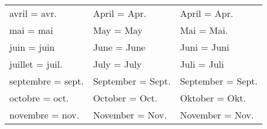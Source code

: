\begin{table}[!ht]
\begin{center}
\begin{tabular}{lll}
       avril = avr.       & April = Apr.       & April = Apr.\\
       mai = mai          & May = May          & Mai = Mai.\\
       juin = juin        & June = June        & Juni = Juni\\
       juillet = juil.    & July = July        & Juli = Juli\\
       septembre = sept.  & September = Sept.  & September = Sept.\\
       octobre = oct.     & October = Oct.     & Oktober = Okt.\\
       novembre = nov.    & November = Nov.    & November = Nov.\\
    \hline
   \end{tabular}
   \end{center}
\end{table}